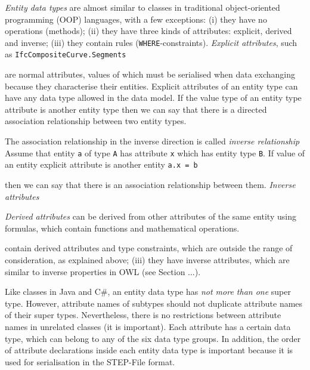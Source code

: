 


    










    

     

% 
% 
\emph{Entity data types} are almost similar to classes in traditional object-oriented programming (OOP) languages, with a few exceptions:
(i) they have no operations (methods);
(ii) they have three kinds of attributes: explicit, derived and inverse;
(iii) they contain rules (\texttt{WHERE}-constraints).
\emph{Explicit attributes}, such as \texttt{IfcCompositeCurve.Segments} 

are normal attributes, values of which must be serialised when data exchanging because they characterise their entities.
Explicit attributes of an entity type can have any data type allowed in the data model.
If the value type of an entity type attribute is another entity type then we can say that there is a directed association relationship between two entity types.

The association relationship in the inverse direction is called \emph{inverse relationship}
Assume that entity \texttt{a} of type \texttt{A} has attribute \texttt{x} which has entity type \texttt{B}.
If value of an entity explicit attribute is another entity \texttt{a.x = b}

then we can say that there is an association relationship between them.
\emph{Inverse attributes} 

\emph{Derived attributes} can be derived from other attributes of the same entity using formulas, which contain functions and mathematical operations.

    
    contain derived attributes and type constraints, which are outside the range of consideration, as explained above;
    (iii) they have inverse attributes, which are similar to inverse properties in OWL (see Section ...).
    
    Like classes in Java and C{\#}, an entity data type has \emph{not more than one} super type.
    However, attribute names of subtypes should not duplicate attribute names of their super types.
    Nevertheless, there is no restrictions between attribute names in unrelated classes (it is important).
    Each attribute has a certain data type, which can belong to any of the six data type groups.
    In addition, the order of attribute declarations inside each entity data type is important because it is used for serialisation in the STEP-File format.
    
